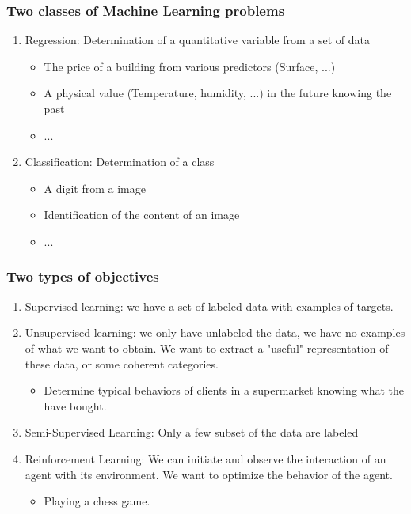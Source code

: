 \documentclass[handout, 10pt]{beamer}
\begin{document}
\begin{frame}
\frametitle{Two classes of Machine Learning problems}
\begin{enumerate}
\item \alert{Regression}: Determination of a quantitative variable from a set of data
\begin{itemize}
\item The price of a building from various predictors (Surface, ...)
\item A physical value (Temperature, humidity, ...) in the future knowing the past
\item ...
\end{itemize}
\pause
\item \alert{Classification}: Determination of a class 
\begin{itemize}
\item A digit from a image
\item Identification of the content of an image
\item ...
\end{itemize}
\end{enumerate}
\end{frame}
\begin{frame}
\frametitle{Two types of objectives}

\begin{enumerate}[<+->]
\item \alert{Supervised learning}: we have a set of labeled data with examples of targets.
\item \alert{Unsupervised learning}: we only have unlabeled the data, we have no examples of
what we want to obtain. We want to extract a "useful" representation of these data, or
some coherent categories.
\begin{itemize}
\item Determine typical behaviors of clients in a supermarket knowing what the have bought.
\end{itemize}
\item \alert{Semi-Supervised Learning}: Only a few subset of the data are labeled
\item \alert{Reinforcement Learning}: We can initiate and observe the interaction of an agent with its environment. We want to optimize the behavior of the agent.
\begin{itemize}
\item Playing a chess game.
\end{itemize}
\end{enumerate}
\end{frame}
\end{document}
